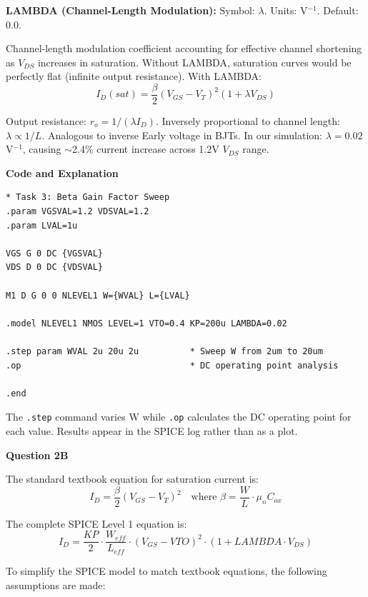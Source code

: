 \documentclass[a4paper,12pt]{article}
\begin{document}
\textbf{LAMBDA (Channel-Length Modulation):}
Symbol: $\lambda$. Units: V$^{-1}$. Default: 0.0.

Channel-length modulation coefficient accounting for effective channel shortening as $V_{DS}$ increases in saturation. Without LAMBDA, saturation curves would be perfectly flat (infinite output resistance). With LAMBDA:
\begin{equation}
I_D(sat) = \frac{\beta}{2}(V_{GS} - V_T)^2(1 + \lambda V_{DS})
\end{equation}

Output resistance: $r_o = 1/(\lambda I_D)$. Inversely proportional to channel length: $\lambda \propto 1/L$. Analogous to inverse Early voltage in BJTs. In our simulation: $\lambda = 0.02$ V$^{-1}$, causing $\sim$2.4\% current increase across 1.2V $V_{DS}$ range.

\textbf{Code and Explanation}

\begin{lstlisting}[caption=PMOS Sweep Simulation Code, label=lst:beta_sweep]
* Task 3: Beta Gain Factor Sweep
.param VGSVAL=1.2 VDSVAL=1.2
.param LVAL=1u

VGS G 0 DC {VGSVAL}
VDS D 0 DC {VDSVAL}

M1 D G 0 0 NLEVEL1 W={WVAL} L={LVAL}

.model NLEVEL1 NMOS LEVEL=1 VTO=0.4 KP=200u LAMBDA=0.02

.step param WVAL 2u 20u 2u          * Sweep W from 2um to 20um
.op                                 * DC operating point analysis

.end
\end{lstlisting}

The \texttt{.step} command varies W while \texttt{.op} calculates the DC operating point for each value. Results appear in the SPICE log rather than as a plot.

\textbf{Question 2B}

The standard textbook equation for saturation current is:
\begin{equation}
I_D = \frac{\beta}{2}(V_{GS} - V_T)^2 \quad \text{where } \beta = \frac{W}{L} \cdot \mu_n C_{ox}
\end{equation}

The complete SPICE Level 1 equation is:
\begin{equation}
I_D = \frac{KP}{2} \cdot \frac{W_{eff}}{L_{eff}} \cdot (V_{GS} - VTO)^2 \cdot (1 + LAMBDA \cdot V_{DS})
\end{equation}

To simplify the SPICE model to match textbook equations, the following assumptions are made:
\end{document}
